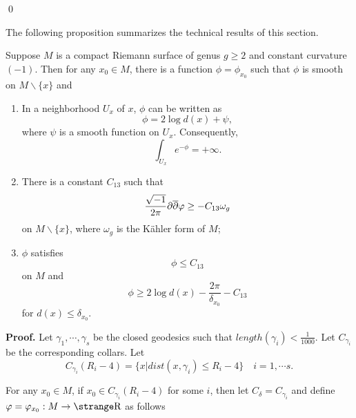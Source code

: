  \qed



The following proposition summarizes the technical results of this
section.
\begin{prop}\label{tech}
Suppose $M$ is a compact Riemann surface of genus $g\geq 2$ and
constant curvature $(-1)$. Then for any $x_0\in M$, there is a function
$\phi=\phi_{x_0}$ such that $\phi$ is smooth on $M\backslash\{x\}$ and 
\begin{enumerate}
\item In a neighborhood $U_x$ of $x$, $\phi$ can be written as
\[
\phi=2\log d(x)+\psi,
\]
where $\psi$ is a smooth function on $U_x$. Consequently,
\begin{equation}\label{infty}
\int_{U_x} e^{-\phi}=+\infty.
\end{equation}
\item There is a constant $C_{13}$ such that
\begin{equation}\label{t-lower}
\frac{\sqrt{-1}}{2\pi}\partial\overline{\partial}\varphi\geq -C_{13}\omega_g
\end{equation}
on $M\backslash\{x\}$, where $\omega_g$ is the K\"ahler form
of $M$;
\item $\phi$ satisfies
\begin{equation}\label{t-upper}
\phi\leq C_{13}
\end{equation}
on $M$ and
\begin{equation}\label{t-lowerb}
\phi\geq 2\log d(x)-\frac{2\pi}{\delta_{x_0}}-C_{13}
\end{equation}
for $d(x)\leq\delta_{x_0}$.
\end{enumerate}
\end{prop}

{\bf Proof.} Let $\gamma_1,\cdots,\gamma_s$ be the closed geodesics
such that $length(\gamma_i)<\frac{1}{1000}$. Let
$C_{\gamma_i}$ be the corresponding collars. Let
\[
C_{\gamma_i}(R_i-4)=\{
x| dist(x,\gamma_i)\leq R_i-4\}\quad i=1,\cdots s.
\]

For any $x_0\in M$, if $x_0\in C_{\gamma_i}(R_i-4)$ for some $i$,
then let $C_\delta=C_{\gamma_i}$ and
 define
$\phi=\phi_{x_0}:M\rightarrow \R$ as follows

